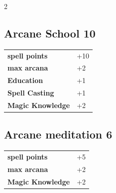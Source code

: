 \begin{multicols}{2}
\begin{tcolorbox}

\end{tcolorbox}

\begin{tcolorbox}
    \subsection*{Arcane School \hfill \small{10 }}
    \tcblower




\begin{tabular}{@{}ll@{}}
    \textbf{spell points} & +10\\
    \textbf{max arcana} & +2\\
    \textbf{Education} & +1\\
    \textbf{Spell Casting} & +1\\
    \textbf{Magic Knowledge} & +2\\
\end{tabular}


\end{tcolorbox}

\begin{tcolorbox}
    \subsection*{Arcane meditation \hfill \small{6 }}
    \tcblower




\begin{tabular}{@{}ll@{}}
    \textbf{spell points} & +5\\
    \textbf{max arcana} & +2\\
    \textbf{Magic Knowledge} & +2\\
\end{tabular}


\end{tcolorbox}

\begin{tcolorbox}

\end{tcolorbox}
\end{multicols}
